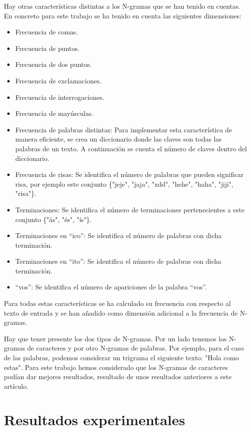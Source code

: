 \documentclass[11pt,a4paper]{article}
\begin{document}
Hay otras características distintas a los N-gramas que se han tenido en cuentas. En concreto para este trabajo se ha tenido en cuenta las siguientes dimensiones:
\begin{itemize}
\item Frecuencia de comas.
\item Frecuencia de puntos.
\item Frecuencia de dos puntos.
\item Frecuencia de exclamaciones.
\item Frecuencia de interrogaciones.
\item Frecuencia de mayúsculas.
\item Frecuencia de palabras distintas: Para implementar esta característica de manera eficiente, se crea un diccionario donde las claves son todas las palabras de un texto. A continuación se cuenta el número de claves dentro del diccionario.
\item Frecuencia de risas: Se identifica el número de palabras que pueden significar risa, por ejemplo este conjunto \{"jeje", "jaja", "xdd", "hehe", "haha", "jiji", "risa"\}.
\item Terminaciones: Se identifica el número de terminaciones pertenecientes a este conjunto \{"ás", "és", "ís"\}.
\item Terminaciones en ``ico'': Se identifica el número de palabras con dicha terminación.
\item Terminaciones en ``ito'': Se identifica el número de palabras con dicha terminación.
\item ``vos'': Se identifica el número de apariciones de la palabra ``vos''.
\end{itemize}

Para todas estas características se ha calculado su frecuencia con respecto al texto de entrada y se han añadido como dimensión adicional a la frecuencia de N-gramas.

Hay que tener presente los dos tipos de N-gramas. Por un lado tenemos los N-gramas de caracteres y por otro N-gramas de palabras. Por ejemplo, para el caso de las palabras, podemos considerar un trigrama el siguiente texto: "Hola como estas". Para este trabajo hemos considerado que los N-gramas de caracteres podían dar mejores resultados, resultado de unos resultados anteriores a este artículo.

\section{Resultados experimentales}
\end{document}
